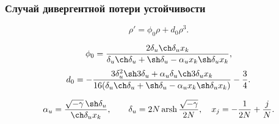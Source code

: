 \documentclass[fullscreen=true, unicode, bookmarks=false]{beamer}
\DeclareMathOperator{\arsh}{arsh}
\begin{document}
\begin{frame}
\frametitle{ Случай дивергентной потери устойчивости }

$$ \rho' = \phi_0 \rho + d_0 \rho^3. $$

\vfill

$$ \phi_0 = \frac{ 2 \delta_u \ch \delta_u x_k }{ \delta_u \ch \delta_u +\sh \delta_u - \alpha_u x_k \sh \delta_u x_k }, $$
$$ d_0 = -\frac{ 3\delta_u^2 \sh 3\delta_u + \alpha_u \delta_u \ch 3\delta_u x_k }{ 16( \delta_u \ch \delta_u +\sh \delta_u - \alpha_u x_k \sh \delta_u x_k ) } - \frac{3}{4}. $$

\vfill

$$ \alpha_u = \frac{ \sqrt{-\gamma} \, \sh \delta_u }{ \ch\delta_u x_k }, \qquad \delta_u = 2N \arsh \dfrac{\sqrt{-\gamma}}{2N}, \quad x_j = -\dfrac{1}{2N} + \dfrac{j}{N}. $$

\end{frame}
\end{document}
